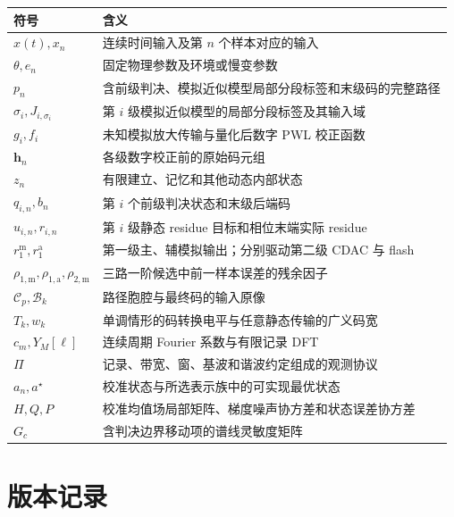 \documentclass[11pt,a4paper]{ctexart}
\theoremstyle{adcplain}
\theoremstyle{definition}
\begin{document}
\noindent\begin{tabularx}{\textwidth}{p{28mm}X}
\toprule
符号 & 含义 \\
\midrule
$x(t),x_n$ & 连续时间输入及第 $n$ 个样本对应的输入 \\
$\theta,e_n$ & 固定物理参数及环境或慢变参数 \\
$p_n$ & 含前级判决、模拟近似模型局部分段标签和末级码的完整路径 \\
$\sigma_i,J_{i,\sigma_i}$ & 第 $i$ 级模拟近似模型的局部分段标签及其输入域 \\
$g_i,f_i$ & 未知模拟放大传输与量化后数字 PWL 校正函数 \\
$\mathbf h_n$ & 各级数字校正前的原始码元组 \\
$z_n$ & 有限建立、记忆和其他动态内部状态 \\
$q_{i,n},b_n$ & 第 $i$ 个前级判决状态和末级后端码 \\
$u_{i,n},r_{i,n}$ & 第 $i$ 级静态 residue 目标和相位末端实际 residue \\
$r_1^{\mathrm m},r_1^{\mathrm a}$ & 第一级主、辅模拟输出；分别驱动第二级 CDAC 与 flash \\
$\rho_{1,\mathrm m},\rho_{1,\mathrm a},\rho_{2,\mathrm m}$ & 三路一阶候选中前一样本误差的残余因子 \\
$\mathcal C_p,\mathcal B_k$ & 路径胞腔与最终码的输入原像 \\
$T_k,w_k$ & 单调情形的码转换电平与任意静态传输的广义码宽 \\
$c_m,Y_M[\ell]$ & 连续周期 Fourier 系数与有限记录 DFT \\
$\Pi$ & 记录、带宽、窗、基波和谐波约定组成的观测协议 \\
$a_n,a^\star$ & 校准状态与所选表示族中的可实现最优状态 \\
$H,Q,P$ & 校准均值场局部矩阵、梯度噪声协方差和状态误差协方差 \\
$G_c$ & 含判决边界移动项的谱线灵敏度矩阵 \\
\bottomrule
\end{tabularx}

\section{版本记录}
\end{document}

